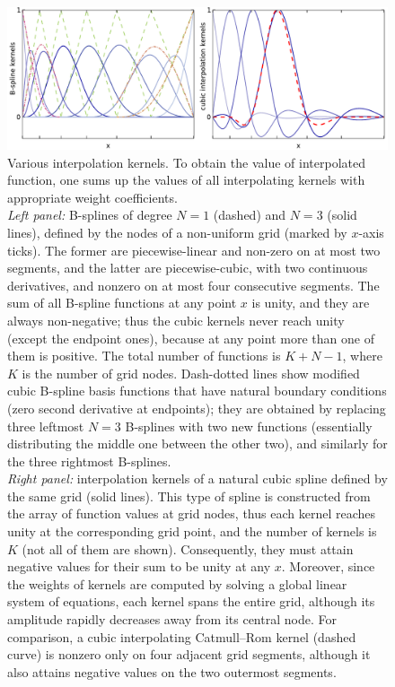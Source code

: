 \documentclass[12pt]{article}
\begin{document}
\begin{figure}
\begin{center}
\includegraphics[width=16cm]{SplineKernels.pdf}
\end{center}
\caption{Various interpolation kernels. To obtain the value of interpolated function, one sums up the values of all interpolating kernels with appropriate weight coefficients. \protect\\
\textit{Left panel:} B-splines of degree $N=1$ (dashed) and $N=3$ (solid lines), defined by the nodes of a non-uniform grid (marked by $x$-axis ticks). The former are piecewise-linear and non-zero on at most two segments, and the latter are piecewise-cubic, with two continuous derivatives, and nonzero on at most four consecutive segments. The sum of all B-spline functions at any point $x$ is unity, and they are always non-negative; thus the cubic kernels never reach unity (except the endpoint ones), because at any point more than one of them is positive.
The total number of functions is $K+N-1$, where $K$ is the number of grid nodes.
Dash-dotted lines show modified cubic B-spline basis functions that have natural boundary conditions (zero second derivative at endpoints); they are obtained by replacing three leftmost $N=3$ B-splines with two new functions (essentially distributing the middle one between the other two), and similarly for the three rightmost B-splines.\protect\\
\textit{Right panel:} interpolation kernels of a natural cubic spline defined by the same grid (solid lines). This type of spline is constructed from the array of function values at grid nodes, thus each kernel reaches unity at the corresponding grid point, and the number of kernels is $K$ (not all of them are shown). Consequently, they must attain negative values for their sum to be unity at any $x$. Moreover, since the weights of kernels are computed by solving a global linear system of equations, each kernel spans the entire grid, although its amplitude rapidly decreases away from its central node. For comparison, a cubic interpolating Catmull--Rom kernel (dashed curve) is nonzero only on four adjacent grid segments, although it also attains negative values on the two outermost segments. } \label{fig:SplineKernels}
\end{figure}
\end{document}
